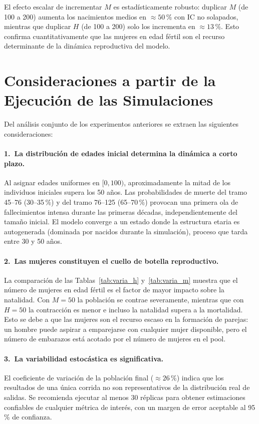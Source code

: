 \documentclass[12pt, a4paper]{article}
\begin{document}
\noindent
El efecto escalar de incrementar $M$ es estadísticamente robusto:
duplicar $M$ (de 100 a 200) aumenta los nacimientos medios en
$\approx 50\,\%$ con IC no solapados, mientras que duplicar $H$
(de 100 a 200) solo los incrementa en $\approx 13\,\%$.
Esto confirma cuantitativamente que las mujeres en edad fértil son
el recurso determinante de la dinámica reproductiva del modelo.

\section{Consideraciones a partir de la Ejecución de las Simulaciones}

Del análisis conjunto de los experimentos anteriores se extraen las
siguientes consideraciones:

\paragraph{1.~La distribución de edades inicial determina la dinámica a
corto plazo.}
Al asignar edades uniformes en $[0, 100)$, aproximadamente la mitad de los
individuos iniciales supera los 50 años. Las probabilidades de muerte del
tramo 45--76 (30--35\,\%) y del tramo 76--125 (65--70\,\%) provocan una
primera ola de fallecimientos intensa durante las primeras décadas,
independientemente del tamaño inicial. El modelo converge a un estado
donde la estructura etaria es autogenerada (dominada por nacidos durante
la simulación), proceso que tarda entre 30 y 50 años.

\paragraph{2.~Las mujeres constituyen el cuello de botella reproductivo.}
La comparación de las Tablas~\ref{tab:varia_h} y~\ref{tab:varia_m} muestra
que el número de mujeres en edad fértil es el factor de mayor impacto sobre
la natalidad. Con $M = 50$ la población se contrae severamente, mientras
que con $H = 50$ la contracción es menor e incluso la natalidad supera
a la mortalidad. Esto se debe a que las mujeres son el recurso escaso en
la formación de parejas: un hombre puede aspirar a emparejarse con cualquier
mujer disponible, pero el número de embarazos está acotado por el número
de mujeres en el pool.

\paragraph{3.~La variabilidad estocástica es significativa.}
El coeficiente de variación de la población final ($\approx 26\,\%$) indica
que los resultados de una única corrida no son representativos de la
distribución real de salidas. Se recomienda ejecutar al menos 30 réplicas
para obtener estimaciones confiables de cualquier métrica de interés, con
un margen de error aceptable al 95\,\% de confianza.
\end{document}
